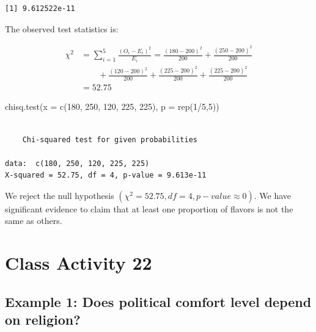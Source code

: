\documentclass[
]{book}
\newenvironment{Shaded}{\begin{snugshade}}{\end{snugshade}}
\newcommand{\AttributeTok}[1]{\textcolor[rgb]{0.77,0.63,0.00}{#1}}
\newcommand{\DecValTok}[1]{\textcolor[rgb]{0.00,0.00,0.81}{#1}}
\newcommand{\FunctionTok}[1]{\textcolor[rgb]{0.00,0.00,0.00}{#1}}
\newcommand{\NormalTok}[1]{#1}
\newcommand{\SpecialCharTok}[1]{\textcolor[rgb]{0.00,0.00,0.00}{#1}}
\begin{document}
\begin{verbatim}
[1] 9.612522e-11
\end{verbatim}

The observed test statistics is:

\begin{align*}
\chi^2 &= \sum_{i=1}^5 \frac{(O_i-E_i)^2}{E_i} = \frac{(180 - 200)^2}{200} + \frac{(250 - 200)^2}{200}\\ & \qquad + \frac{(120 - 200)^2}{200} + \frac{(225 - 200)^2}{200} + \frac{(225 - 200)^2}{200}\\
&=  52.75
\end{align*}

\begin{Shaded}
\begin{Highlighting}[]
\FunctionTok{chisq.test}\NormalTok{(}\AttributeTok{x =} \FunctionTok{c}\NormalTok{(}\DecValTok{180}\NormalTok{, }\DecValTok{250}\NormalTok{, }\DecValTok{120}\NormalTok{, }\DecValTok{225}\NormalTok{, }\DecValTok{225}\NormalTok{), }\AttributeTok{p =} \FunctionTok{rep}\NormalTok{(}\DecValTok{1}\SpecialCharTok{/}\DecValTok{5}\NormalTok{,}\DecValTok{5}\NormalTok{))}
\end{Highlighting}
\end{Shaded}

\begin{verbatim}

    Chi-squared test for given probabilities

data:  c(180, 250, 120, 225, 225)
X-squared = 52.75, df = 4, p-value = 9.613e-11
\end{verbatim}

We reject the null hypothesis \((\chi^2 = 52.75, df = 4, p-value \approx 0)\). We have significant evidence to claim that at least one proportion of flavors is not the same as others.

\hypertarget{class-activity-22}{%
\chapter{Class Activity 22}\label{class-activity-22}}

\hypertarget{example-1-does-political-comfort-level-depend-on-religion}{%
\section{Example 1: Does political comfort level depend on religion?}\label{example-1-does-political-comfort-level-depend-on-religion}}
\end{document}
